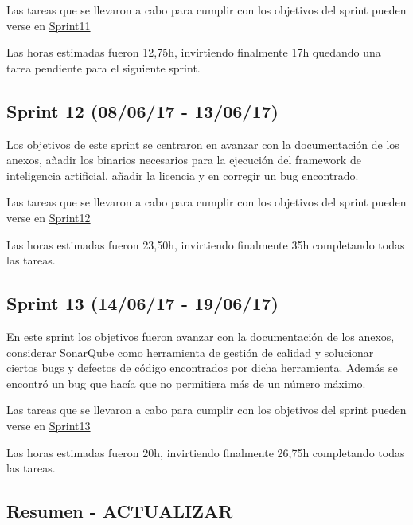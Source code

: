 Las tareas que se llevaron a cabo para cumplir con los objetivos del sprint pueden verse en \href{https://github.com/DanielSantidrian/UBUassistant/milestone/14?closed=1}{Sprint11}

Las horas estimadas fueron 12,75h, invirtiendo finalmente 17h quedando una tarea pendiente para el siguiente sprint.



\subsection{Sprint 12 (08/06/17 - 13/06/17)}

Los objetivos de este sprint se centraron en avanzar con la documentación de los anexos, añadir los binarios necesarios para la ejecución del framework de inteligencia artificial, añadir la licencia y en corregir un bug encontrado.

Las tareas que se llevaron a cabo para cumplir con los objetivos del sprint pueden verse en \href{https://github.com/DanielSantidrian/UBUassistant/milestone/15?closed=1}{Sprint12}

Las horas estimadas fueron 23,50h, invirtiendo finalmente 35h completando todas las tareas.


\subsection{Sprint 13 (14/06/17 - 19/06/17)}

En este sprint los objetivos fueron avanzar con la documentación de los anexos, considerar SonarQube como herramienta de gestión de calidad y solucionar ciertos bugs y defectos de código encontrados por dicha herramienta. Además se encontró un bug que hacía que no permitiera más de un número máximo.

Las tareas que se llevaron a cabo para cumplir con los objetivos del sprint pueden verse en \href{https://github.com/DanielSantidrian/UBUassistant/milestone/16?closed=1}{Sprint13}

Las horas estimadas fueron 20h, invirtiendo finalmente 26,75h completando todas las tareas.



\subsection{Resumen - ACTUALIZAR}\label{resumen}

